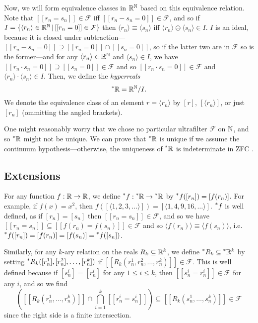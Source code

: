 Now, we will form equivalence classes in $\mathbb{R}^{\mathbb{N}}$ based on this equivalence relation. Note that $[[r_n = s_n]] \in \mathcal{F}$ iff $[[r_n - s_n = 0]] \in \mathcal{F}$, and so if $I = \{\langle r_n \rangle \in \mathbb{R}^{\mathbb{N}} \,|\, [[r_n = 0]] \in \mathcal{F}\}$ then $\langle r_n \rangle \equiv \langle s_n \rangle$ iff $\langle r_n \rangle \ominus \langle s_n \rangle \in I$. $I$ is an ideal, because it is closed under subtraction---$[[r_n - s_n = 0]] \supseteq [[r_n = 0]] \cap [[s_n = 0]]$, so if the latter two are in $\mathcal{F}$ so is the former---and for any $\langle r_n \rangle \in \mathbb{R}^{\mathbb{N}}$ and $\langle s_n \rangle \in I$, we have $[[r_n \cdot s_n = 0]] \supseteq [[s_n = 0]] \in \mathcal{F}$ and so $[[r_n \cdot s_n = 0]] \in \mathcal{F}$ and $\langle r_n \rangle \cdot \langle s_n \rangle \in I$. Then, we define the \textit{hyperreals}
\[ \prescript{*}{}{\mathbb{R}} = \mathbb{R}^{\mathbb{N}} / I. \]
We denote the equivalence class of an element $r = \langle r_n \rangle$ by $[r]$, $[\langle r_n \rangle]$, or just $[r_n]$ (ommitting the angled brackets).

One might reasonably worry that we chose no particular ultrafilter $\mathcal{F}$ on $\mathbb{N}$, and so $\prescript{*}{}{\mathbb{R}}$ might not be unique. We can prove that $\prescript{*}{}{\mathbb{R}}$ is unique if we assume the continuum hypothesis---otherwise, the uniqueness of $\prescript{*}{}{\mathbb{R}}$ is indeterminate in ZFC \cite[33]{goldblatt1998}.

\subsection{Extensions}\label{sec:extensions}

For any function $f: \mathbb{R} \to \mathbb{R}$, we define $\prescript{*}{}{f}: \prescript{*}{}{\mathbb{R}} \to \prescript{*}{}{\mathbb{R}}$ by $\prescript{*}{}{f}([r_n]) = [f(r_n)]$. For example, if $f(x) = x^2$, then $f([\langle 1, 2, 3, \ldots \rangle]) = [\langle 1, 4, 9, 16, \ldots \rangle]$. $\prescript{*}{}{f}$ is well defined, as if $[r_n] = [s_n]$ then $[[r_n = s_n]] \in \mathcal{F}$, and so we have $[[r_n = s_n]] \subseteq [[f(r_n) = f(s_n)]] \in \mathcal{F}$ and so $\langle f(r_n) \rangle \equiv \langle f(s_n) \rangle$, i.e. $\prescript{*}{}{f}([r_n]) = [f(r_n)] = [f(s_n)] = \prescript{*}{}{f}([s_n])$.

Similarly, for any $k$-ary relation on the reals $R_k \subseteq \mathbb{R}^k$, we define $\prescript{*}{}{R}_k \subseteq \prescript{*}{}{\mathbb{R}}^k$ by setting $\prescript{*}{}{R}_k([r_n^1], [r_n^2], \ldots, [r_n^k])$ if $[[R_k(r_n^1, r_n^2, \ldots, r_n^k)]] \in \mathcal{F}$. This is well defined because if $[s_n^i] = [r_n^i]$ for any $1 \leq i \leq k$, then $[[s_n^i = r_n^i]] \in \mathcal{F}$ for any $i$, and so we find
\[
\left([[R_k(r_n^1, \ldots, r_n^k)]] \cap \bigcap_{i = 1}^k [[r_n^i = s_n^i]]\right) \subseteq [[R_k(s_n^1, \ldots, s_n^k)]] \in \mathcal{F}
\]
since the right side is a finite intersection.

